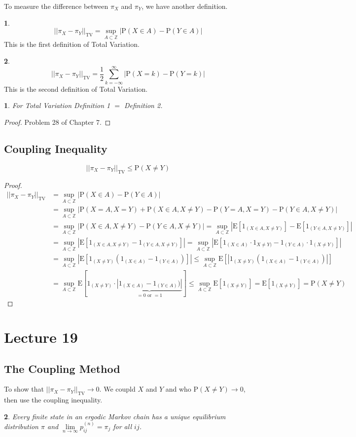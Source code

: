 \documentclass[english,12pt]{article}
\theoremstyle{plain}
\newtheorem*{proposition}{\protect\propositionname}
\theoremstyle{definition}
\newtheorem*{definition}{\protect\definitionname}
\theoremstyle{definition} %
\newcommand{\prop}[1]{\begin{proposition} #1 \end{proposition} }
\newcommand{\defn}[1]{\begin{definition} #1 \end{definition} }
\newcommand{\prf}[1]{\begin{proof} #1 \end{proof} }
\providecommand{\definitionname}{Definition}
\providecommand{\propositionname}{Proposition}
\newcommand{\Z}{\mathbb{Z}} %
\newcommand{\p}[1]{\mbox{P} \left( #1 \right)}
\newcommand{\ex}[1]{\mbox{E} \left[ #1 \right]}
\begin{document}
To measure the difference between $\pi_X$ and $\pi_Y$, we have another definition.

\defn{
\[||\pi_X-\pi_Y||_{\text{TV}}=\sup_{A\subset\Z}|\p{X\in A}-\p{Y\in A}|\]
This is the first definition of Total Variation.
}

\defn{
\[||\pi_X-\pi_Y||_{\text{TV}}=\frac{1}{2}\sum_{k=-\infty}^\infty|\p{X=k}-\p{Y=k}|\]
This is the second definition of Total Variation.
}

\prop{
For Total Variation Definition 1 $=$ Definition 2.
}

\prf{
Problem 28 of Chapter 7.
}

\subsection{Coupling Inequality}
\[||\pi_X-\pi_Y||_{\text{TV}}\le\p{X\ne Y}\]

\prf{
\begin{align*}
||\pi_X-\pi_Y||_{\text{TV}}&=\sup_{A\subset\Z}|\p{X\in A}-\p{Y\in A}|\\
&=\sup_{A\subset\Z}|\p{X=A,X=Y}+\p{X\in A,X\ne Y}-\p{Y=A,X=Y}-\p{Y\in A,X\ne Y}|\\
&=\sup_{A\subset\Z}|\p{X\in A,X\ne Y}-\p{Y\in A, X\ne Y}|
=\sup_{A\subset\Z}|\ex{1_{(X\in A,X\ne Y)}}-\ex{1_{(Y\in A,X\ne Y)}}|\\
&=\sup_{A\subset\Z}|\ex{1_{(X\in A,X\ne Y)}-1_{(Y\in A,X\ne Y)}}|
=\sup_{A\subset\Z}|\ex{1_{(X\in A)}\cdot 1_{X\ne Y)}-1_{(Y\in A)}\cdot 1_{(X\ne Y)}}|\\
&=\sup_{A\subset\Z}|\ex{1_{(X\ne Y)}(1_{(X\in A)}-1_{(Y\in A)})}|
\le \sup_{A\subset\Z}\ex{|1_{(X\ne Y)}(1_{(X\in A)}-1_{(Y\in A)})|}\\
&=\sup_{A\subset\Z}\ex{1_{(X\ne Y)}\cdot \underbrace{|1_{(X\in A)}-1_{(Y\in A)})|}_{=0\text{ or }=1}}
\le \sup_{A\subset\Z}\ex{1_{(X\ne Y)}}
=\ex{1_{(X\ne Y)}}
=\p{X\ne Y}
\end{align*}
}
\section*{Lecture 19}
\subsection{The Coupling Method}
To show that $||\pi_X-\pi_Y||_{\text{TV}}\to 0$.  We coupld $X$ and $Y$ and who $\p{X\ne Y}\to 0$, then use the coupling inequality.

\prop{
Every finite state in an ergodic Markov chain has a unique equilibrium distribution $\pi$ and $\lim\limits_{n\to\infty}p_{ij}^{(n)}=\pi_j$ for all $ij$.
}
\end{document}
